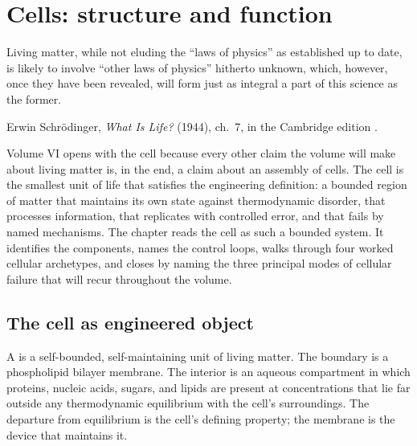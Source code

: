 \chapter{Cells: structure and function}
\label{vol06:ch01}

\epigraph{Living matter, while not eluding the ``laws of physics'' as
established up to date, is likely to involve ``other laws of physics''
hitherto unknown, which, however, once they have been revealed, will
form just as integral a part of this science as the former.}{Erwin
Schr\"odinger, \emph{What Is Life?} (1944), ch.~7, in the Cambridge
edition \cite[p.~76]{hist:schrodinger1944}.}


\noindent
Volume VI opens with the cell because every other claim the volume will
make about living matter is, in the end, a claim about an assembly of
cells. The cell is the smallest unit of life that satisfies the
engineering definition: a bounded region of matter that maintains its
own state against thermodynamic disorder, that processes information,
that replicates with controlled error, and that fails by named
mechanisms. The chapter reads the cell as such a bounded system. It
identifies the components, names the control loops, walks through four
worked cellular archetypes, and closes by naming the three principal
modes of cellular failure that will recur throughout the volume.

\section{The cell as engineered object}

A  is a self-bounded, self-maintaining unit of living
matter. The boundary is a phospholipid bilayer membrane. The interior
is an aqueous compartment in which proteins, nucleic acids, sugars,
and lipids are present at concentrations that lie far outside any
thermodynamic equilibrium with the cell's surroundings. The departure
from equilibrium is the cell's defining property; the membrane is the
device that maintains it.

